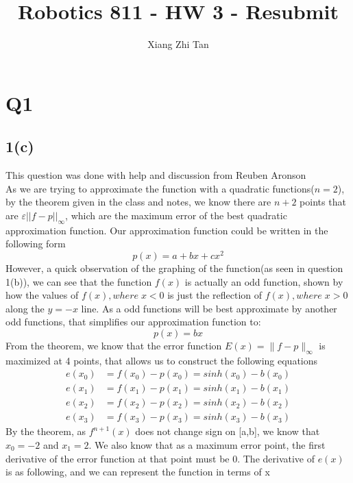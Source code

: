 \documentclass{article}
\begin{document}
\title{Robotics 811 - HW 3 - Resubmit}
\author{Xiang Zhi Tan}
\maketitle

\section{Q1}
\subsection*{1(c)}
This question was done with help and discussion from Reuben Aronson\\
As we are trying to approximate the function with a quadratic functions($n = 2$), by the theorem given in the class and notes, we know there are $n+2$ points that are $\varepsilon ||f-p||_\infty$, which are the maximum error of the best quadratic approximation function. Our approximation function could be written in the following form
\begin{equation*}
p(x) = a + bx + cx^2
\end{equation*}
However, a quick observation of the graphing of the function(as seen in question 1(b)), we can see that the function $f(x)$ is actually an odd function, shown by how the values of $f(x), where\;x<0$ is just the reflection of $f(x),where\;x>0$ along the $y = -x$ line. As a odd functions will be best approximate by another odd functions, that simplifies our approximation function to:
\begin{equation} \label{eq:2}
p(x) = bx
\end{equation}
From the theorem, we know that the error function $E(x) = \|f-p\|_{\infty}$ is maximized at 4 points, that allows us to construct the following equations
\begin{equation*}
\begin{aligned}
e(x_0) &= f(x_0) - p(x_0) = sinh(x_0) - b(x_0)\\
e(x_1) &= f(x_1) - p(x_1) = sinh(x_1) - b(x_1)\\
e(x_2) &= f(x_2) - p(x_2) = sinh(x_2) - b(x_2)\\
e(x_3) &= f(x_3) - p(x_3) = sinh(x_3) - b(x_3)
\end{aligned}
\end{equation*}
By the theorem, as $f^{n+1}(x)$ does not change sign on [a,b], we know that $x_0 = -2$ and $x_1 = 2$. We also know that as a maximum error point, the first derivative of the error function at that point must be $0$. The derivative of $e(x)$ is as following, and we can represent the function in terms of x
\end{document}
